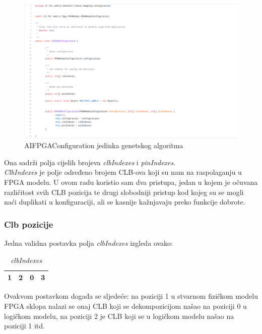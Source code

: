 \documentclass[times, utf8, zavrsni]{fer}
\begin{document}
	\begin{figure}[!htb]
		\centering
		\includegraphics[width=18cm]{slike/AIFPGAConf.png}
		\caption{AIFPGAConfiguration jedinka genetskog algoritma}
		\label{fig:ai-fpga}
	\end{figure}
	
	
	Ona sadrži polja cijelih brojeva \emph{clbIndexes} i \emph{pinIndexes}. \\ \emph{ClbIndexes} je polje određeno brojem CLB-ova koji su nam na raspolaganju u FPGA modelu. U ovom radu koristio sam dva pristupa, jedan u kojem je očuvana različitost svih CLB pozicija te drugi slobodniji pristup kod kojeg su se mogli naći duplikati u konfiguraciji, ali se kasnije kažnjavaju preko funkcije dobrote. 
	
	\subsubsection{Clb pozicije}
	
	Jedna validna postavka polja \emph{clbIndexes} izgleda ovako: 
	
	\begin{table}[htb]
		\caption{\emph{clbIndexes}}
		\label{clbIndexes}
		\centering
		\begin{tabular}{|c | c | c | r|} \hline
			1 & 2 & 0 & 3 \\ \hline
		\end{tabular}
	\end{table}
	
	Ovakvom postavkom događa se sljedeće: na poziciji 1 u stvarnom fizičkom modelu FPGA sklopa nalazi se onaj CLB koji se dekompozicijom našao na poziciji 0 u logičkom modelu, na poziciji 2 je CLB koji se u logičkom modelu našao na poziciji 1 itd. \\
	
\end{document}
